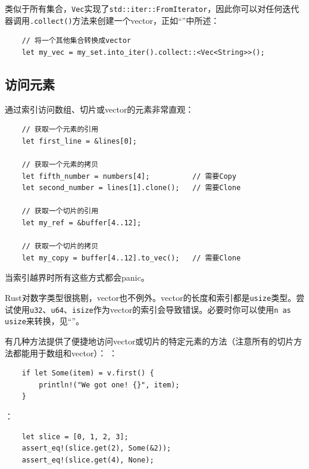 类似于所有集合，\texttt{Vec}实现了\texttt{std::iter::FromIterator}，因此你可以对任何迭代器调用\texttt{.collect()}方法来创建一个vector，正如“”中所述：
\begin{verbatim}
    // 将一个其他集合转换成vector
    let my_vec = my_set.into_iter().collect::<Vec<String>>();
\end{verbatim}

\subsection{访问元素}
通过索引访问数组、切片或vector的元素非常直观：
\begin{verbatim}
    // 获取一个元素的引用
    let first_line = &lines[0];

    // 获取一个元素的拷贝 
    let fifth_number = numbers[4];          // 需要Copy
    let second_number = lines[1].clone();   // 需要Clone

    // 获取一个切片的引用
    let my_ref = &buffer[4..12];

    // 获取一个切片的拷贝
    let my_copy = buffer[4..12].to_vec();   // 需要Clone
\end{verbatim}

当索引越界时所有这些方式都会panic。

Rust对数字类型很挑剔，vector也不例外。vector的长度和索引都是\texttt{usize}类型。尝试使用\texttt{u32}、\texttt{u64}、\texttt{isize}作为vector的索引会导致错误。必要时你可以使用\texttt{n as usize}来转换，见“”。

有几种方法提供了便捷地访问vector或切片的特定元素的方法（注意所有的切片方法都能用于数组和vector）：
：
\begin{verbatim}
    if let Some(item) = v.first() {
        println!("We got one! {}", item);
    }
\end{verbatim}


：
\begin{verbatim}
    let slice = [0, 1, 2, 3];
    assert_eq!(slice.get(2), Some(&2));
    assert_eq!(slice.get(4), None);
\end{verbatim}

